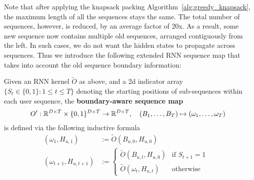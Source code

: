 Note that after applying the knapsack packing Algorithm~\ref{alg:greedy_knapsack}, the maximum length of all the sequences stays the same. The total number of sequences, however, is reduced, by an average factor of 20x. As a result, some new sequence now contains multiple old sequences, arranged contiguously from the left. In such cases, we do not want the hidden states to propagate across sequences. Thus we introduce the following extended RNN sequence map that takes into account the old sequence boundary information:
\begin{definition}
Given an RNN kernel $\tilde{O}$ as above, and a 2d indicator array $\{S_t \in \{0, 1\}: 1 \leq t \leq T\}$ denoting the starting positions of sub-sequences within each user sequence, the \textbf{boundary-aware sequence map} 
\begin{align*}
    O': \mathbb{R}^{D \times T} \times  \{0, 1\}^{D \times T} \to \mathbb{R}^{D \times T}, \quad (B_1, \ldots, B_T) \mapsto (\omega_1, \ldots, \omega_T)
\end{align*} 
is defined via the following inductive formula
\begin{align*}
    (\omega_1, H_{u, 1}) &:= \tilde{O}(B_{u, 0}, H_{u, 0}) \\
    (\omega_{t + 1}, H_{u, t + 1}) &:= 
    \begin{cases}
      \tilde{O}(B_{u, t}, H_{u, 0}) & \text{if  $S_{t+1} = 1$ }\\
      \tilde{O}(\omega_t, H_{u, t}) & \text{otherwise}
    \end{cases}  
\end{align*}
\end{definition}
 

